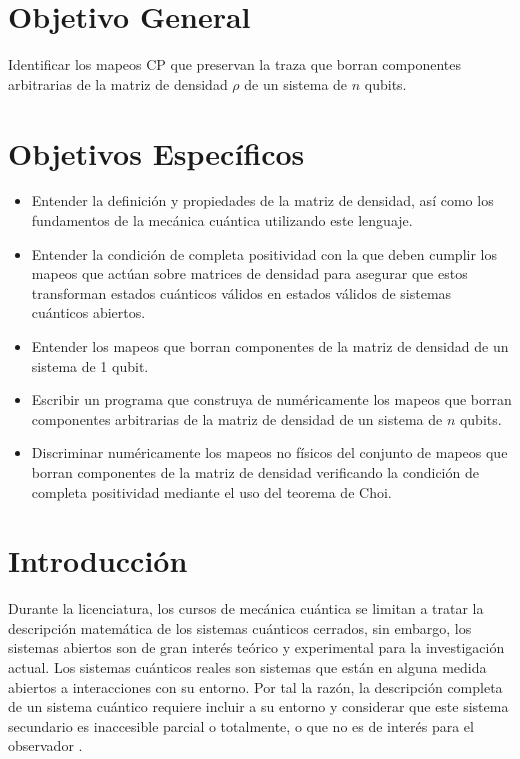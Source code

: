 \section*{Objetivo General}
Identificar los mapeos CP  que preservan la traza que borran
componentes arbitrarias de la matriz de densidad $\rho$ de 
un sistema de $n$ qubits. 	

\section*{Objetivos Específicos}
\begin{itemize}
\item Entender la definición y propiedades de la matriz de densidad, así como
	  los fundamentos de la mecánica cuántica utilizando este lenguaje.
\item Entender la condición de completa positividad con la que deben cumplir 
	  los mapeos que actúan sobre matrices de densidad para asegurar que estos 
	  transforman estados cuánticos válidos en estados válidos de sistemas 
	  cuánticos abiertos.
\item Entender los mapeos que borran componentes de la matriz de densidad
	  de un sistema de 1 qubit.
\item Escribir un programa que construya de numéricamente los mapeos que
	  borran componentes arbitrarias de la matriz de densidad de un sistema 
	  de $n$ qubits.
\item Discriminar numéricamente los mapeos no físicos del conjunto de mapeos
	  que borran componentes de la matriz de densidad verificando 
	  la condición de completa positividad mediante el uso del teorema de Choi. 
\end{itemize}

\section*{Introducción}
Durante la licenciatura, los cursos de mecánica cuántica se limitan a 
tratar la descripción matemática de los sistemas cuánticos cerrados,
sin embargo, los sistemas abiertos son de gran interés teórico
y experimental para la investigación actual. Los sistemas cuánticos 
reales son sistemas que están en alguna medida abiertos a 
interacciones con su entorno. Por tal la razón, la descripción 
completa de un sistema cuántico requiere incluir a su entorno 
y considerar que este sistema secundario es inaccesible parcial 
o totalmente, o que no es de interés para el observador 
\cite{schlosshauer2007decoherence}.

